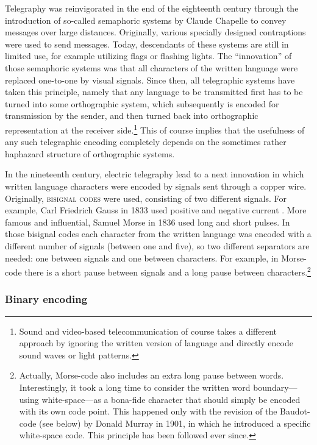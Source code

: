Telegraphy was reinvigorated in the end of the eighteenth century through the
introduction of so-called semaphoric systems by Claude Chapelle to convey
messages over large distances. Originally, various specially designed
contraptions were used to send messages. Today, descendants of these systems are
still in limited use, for example utilizing flags or flashing lights. The
``innovation'' of those semaphoric systems was that all characters of the
written language were replaced one-to-one by visual signals. Since then, all
telegraphic systems have taken this principle, namely that any language to be
transmitted first has to be turned into some orthographic system, which
subsequently is encoded for transmission by the sender, and then turned back
into orthographic representation at the receiver side.\footnote{Sound and
video-based telecommunication of course takes a different approach by ignoring
the written version of language and directly encode sound waves or light
patterns.} This of course implies that the usefulness of any such telegraphic
encoding completely depends on the sometimes rather haphazard structure of
orthographic systems.

In the nineteenth century, electric telegraphy lead to a next innovation in
which written language characters were encoded by signals sent through a copper
wire. Originally, \textsc{bisignal codes} were used, consisting of two different
signals. For example, Carl Friedrich Gauss in 1833 used positive and negative
current \citep[282]{Mania2008}. More famous and influential, Samuel Morse in
1836 used long and short pulses. In those bisignal codes each character from the
written language was encoded with a different number of signals (between one and
five), so two different separators are needed: one between signals and one
between characters. For example, in Morse-code there is a short pause between
signals and a long pause between characters.\footnote{Actually, Morse-code also
includes an extra long pause between words. Interestingly, it took a long time
to consider the written word boundary---using white-space---as a bona-fide
character that should simply be encoded with its own code point. This happened
only with the revision of the Baudot-code (see below) by Donald Murray in 1901,
in which he introduced a specific white-space code. This principle has been
followed ever since.}

\subsubsection*{Binary encoding}

